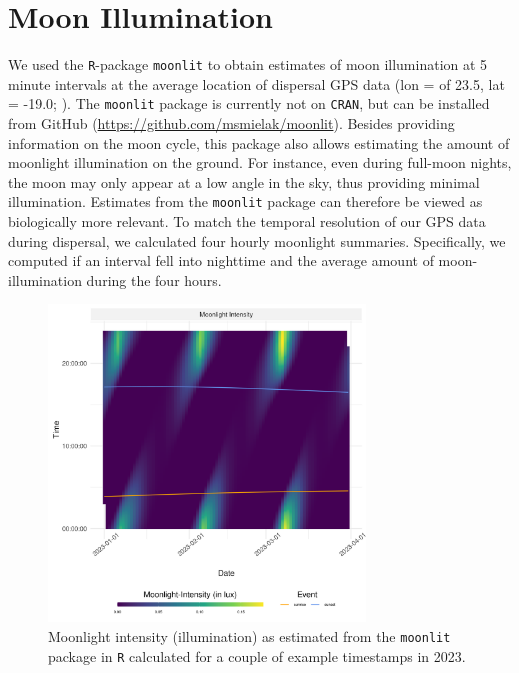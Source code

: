 \documentclass[abstract=on,10pt,a4paper,bibliography=totocnumbered]{article}
\begin{document}
\newpage
\section{Moon Illumination}

We used the \texttt{R}-package \texttt{moonlit} \citep{Smielak.2023} to obtain
estimates of moon illumination at 5 minute intervals at the average location of
dispersal GPS data (lon = of 23.5, lat = -19.0; ). The
\texttt{moonlit} package is currently not on \texttt{CRAN}, but can be installed
from GitHub (\url{https://github.com/msmielak/moonlit}). Besides providing
information on the moon cycle, this package also allows estimating the amount of
moonlight illumination on the ground. For instance, even during full-moon
nights, the moon may only appear at a low angle in the sky, thus providing
minimal illumination. Estimates from the \texttt{moonlit} package can therefore
be viewed as biologically more relevant. To match the temporal resolution of our
GPS data during dispersal, we calculated four hourly moonlight summaries.
Specifically, we computed if an interval fell into nighttime and the average
amount of moon-illumination during the four hours.

\begin{figure}[htbp]
 \begin{center}
  \includegraphics[width = 0.75\textwidth]{Figures/Moonlight.png}
  \caption{Moonlight intensity (illumination) as estimated from the
  \texttt{moonlit} package \citep{Smielak.2023} in \texttt{R} calculated for a
  couple of example timestamps in 2023.}
  \label{Moonlight}
 \end{center}
\end{figure}
\end{document}
